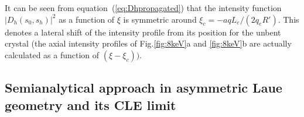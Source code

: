 \documentclass[preprint]{iucr}              %
\newcommand{\todo}[1]{{\color{red}[TODO: "#1'']}}
\newcommand{\inred}[1]{{\color{red}#1}}
\begin{document}
\begin{figure}




\end{figure}

It can be seen from equation~(\ref{eq:Dhpropagated}) that the intensity function $|D_h(s_0,s_h)|^2$ as a function of $\xi$ is symmetric around $\xi_c=-a q L_e / (2 q_e R')$. This denotes a lateral shift of the intensity profile \inred{from its position for the unbent crystal} (the axial intensity profiles of Fig.\ref{fig:8keV}a and \ref{fig:8keV}b are actually calculated as a function of $(\xi-\xi_c))$.

\subsection{Semianalytical approach in asymmetric Laue geometry \inred{and its CLE limit}}
\label{sec:LaueCompatibilityCLE}

\end{document}
